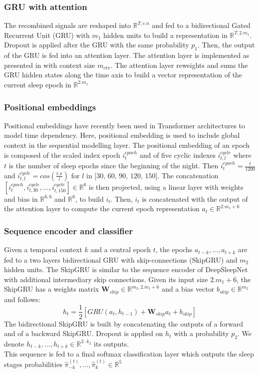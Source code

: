 \documentclass[journal]{IEEEtran}
\begin{document}
\subsubsection{GRU with attention}
The recombined signals are reshaped into $\mathbb{R}^{T,c.n}$ and fed to a bidirectional Gated Recurrent Unit (GRU) \cite{GRU2014} with $m_1$ hidden units to build a representation in $\mathbb{R}^{T,2.m_1}$. Dropout is applied after the GRU with the same probability $p_1$.
Then, the output of the GRU is fed into an attention layer. The attention layer is implemented as presented in \cite{Luong2015} with context size $m_{ctx}$. The attention layer reweights and sums the GRU hidden states along the time axis to build a vector representation of the current sleep epoch in $\mathbb{R}^{2.m_1}$

\subsubsection{Positional embeddings}
Positional embeddings have recently been used in Transformer architectures \cite{transformer2017} to model time dependency. Here, positional embedding is used to include global context in the sequential modelling layer. The positional embedding of an epoch is composed of the scaled index epoch $i^{epoch}_t$ and of five cyclic indexes $i^{cycle}_{t,l}$ where $t$ is the number of sleep epochs since the beginning of the night. Then $i^{epoch}_t= \frac{t}{1200}$ and $i^{cycle}_{t,l}=cos(\frac{t.\pi}{l}) \text{ for $l$ in [30, 60, 90, 120, 150]}$.
The concatenation $[i^{epoch}_t,i^{cycle}_{t,30}, \ldots,i^{cycle}_{t,150}] \in \mathbb{R}^{6} $ is then projected, using a linear layer with weights and bias in $\mathbb{R}^{6,6}$ and $\mathbb{R}^6$, to build $i_t$.
Then, $i_t$ is concatenated with the output of the attention layer to compute the current epoch representation $a_t \in \mathbb{R}^{2.m_1 + 6}$

\subsubsection{Sequence encoder and classifier}
Given a temporal context $k$ and a central epoch $t$, the epochs $a_{t-k}, ..., a_{t+k}$ are fed to a two layers bidirectional GRU with skip-connections (SkipGRU) and $m_2$ hidden units.
The SkipGRU is similar to the sequence encoder of DeepSleepNet \cite{Supratak2017} with additional intermediary skip connections. Given its input size $2.m_1 + 6$, the SkipGRU has a weights matrix $\mathbf{W}_{skip} \in \mathbb{R}^{m_2,2.m_1 + 6}$ and a bias vector $b_{skip} \in \mathbb{R}^{m_2}$ and follows:
$$ h_t = \frac{1}{2} [GRU(a_t,h_{t-1}) + \mathbf{W}_{skip} a_t + b_{skip}]$$ 
The bidirectional SkipGRU is built by concatenating the outputs of a forward and of a backward SkipGRU. Dropout is applied on $h_t$ with a probability $p_2$. We denote $h_{t-k}, \ldots, h_{t+k} \in \mathbb{R}^{2\cdot k_2}$ its outputs.\\
This sequence is fed to a final softmax classification layer which outputs the sleep stages probabilities $\hat{\pi}^{(t)}_{-k}, \ldots, \hat{\pi}^{(t)}_{k} \in \mathbb{R}^{5}$ 
\end{document}
